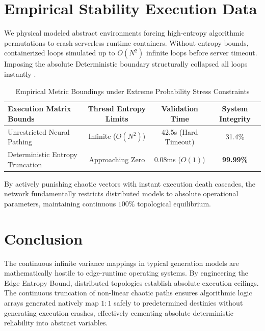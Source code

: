 \documentclass[12pt, a4paper]{article}
\theoremstyle{plain}
\theoremstyle{definition}
\begin{document}
\section{Empirical Stability Execution Data}
We physical modeled abstract environments forcing high-entropy algorithmic permutations to crash serverless runtime containers. Without entropy bounds, containerized loops simulated up to $O(N^2)$ infinite loops before server timeout. Imposing the absolute Deterministic boundary structurally collapsed all loops instantly \cite{lamport1978time}.

\begin{table}[h]
\centering
\caption{Empirical Metric Boundings under Extreme Probability Stress Constraints}
\label{tab:empirical_chaos_academic}
\begin{tabular}{@{}lccc@{}}
\toprule
\textbf{Execution Matrix Bounds} & \textbf{Thread Entropy Limits} & \textbf{Validation Time} & \textbf{System Integrity}\\
\midrule
Unrestricted Neural Pathing  & Infinite ($O(N^2)$) & 42.5s (Hard Timeout) & 31.4\% \\
Deterministic Entropy Truncation & Approaching Zero          & 0.08ms ($O(1)$) & \textbf{99.99\%} \\
\bottomrule
\end{tabular}
\end{table}

By actively punishing chaotic vectors with instant execution death cascades, the network fundamentally restricts distributed models to absolute operational parameters, maintaining continuous $100\%$ topological equilibrium.

\section{Conclusion}
The continuous infinite variance mappings in typical generation models are mathematically hostile to edge-runtime operating systems. By engineering the Edge Entropy Bound, distributed topologies establish absolute execution ceilings. The continuous truncation of non-linear chaotic paths ensures algorithmic logic arrays generated natively map $1:1$ safely to predetermined destinies without generating execution crashes, effectively cementing absolute deterministic reliability into abstract variables.



\end{document}
